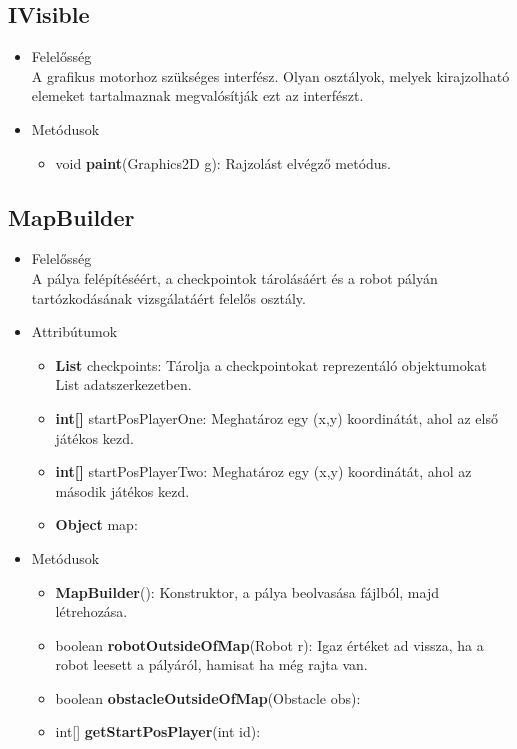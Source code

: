 \subsection{IVisible}
\begin{itemize}
\item Felelősség\\
A grafikus motorhoz szükséges interfész. Olyan osztályok, melyek kirajzolható elemeket tartalmaznak megvalósítják ezt az interfészt.
\item Metódusok\\
	\begin{itemize}
		\item void \textbf{paint}(Graphics2D g): Rajzolást elvégző metódus.
	\end{itemize}
\end{itemize}

\subsection{MapBuilder}
\begin{itemize}
\item Felelősség\\
A pálya felépítéséért, a checkpointok tárolásáért és a robot pályán tartózkodásának vizsgálatáért felelős osztály.
\item Attribútumok
	\begin{itemize}
		\item \textbf{List} checkpoints: Tárolja a checkpointokat reprezentáló objektumokat List adatszerkezetben.
		\item \textbf{int[]} startPosPlayerOne: Meghatároz egy (x,y) koordinátát, ahol az első játékos kezd.
		\item \textbf{int[]} startPosPlayerTwo: Meghatároz egy (x,y) koordinátát, ahol az második játékos kezd.
		\item \textbf{Object} map: 
	\end{itemize}
\item Metódusok
	\begin{itemize}
		\item \textbf{MapBuilder}(): Konstruktor, a pálya beolvasása fájlból, majd létrehozása.
		\item boolean \textbf{robotOutsideOfMap}(Robot r): Igaz értéket ad vissza, ha a robot leesett a pályáról, hamisat ha még rajta van.
	    \item boolean \textbf{obstacleOutsideOfMap}(Obstacle obs): 
	    \item int[] \textbf{getStartPosPlayer}(int id): 
	\end{itemize}
\end{itemize}

